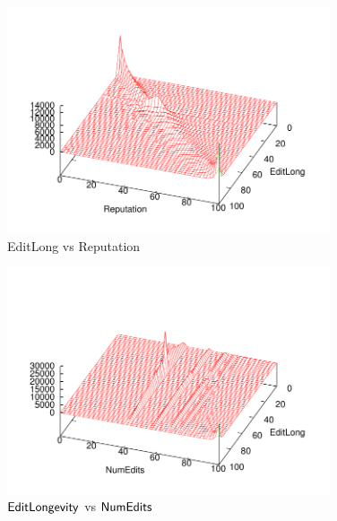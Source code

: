 \begin{figure}[tbph]
    \begin{center}
    \includegraphics[width=0.85\textwidth]{part-I10-contrib/graphs/prct-editlong-reputation}
    \end{center}
    \caption[EditLong vs Reputation]{
    	EditLong vs Reputation
    }
    \label{fig-prct-editlong-reputation}
\end{figure}

\begin{figure}[tbph]
    \begin{center}
    \includegraphics[width=0.85\textwidth]{part-I10-contrib/graphs/prct-editlong-numedits}
    \end{center}
    \caption[$\editlong$ vs $\numedits$]{
    	$\editlong$ vs $\numedits$
    }
    \label{fig-prct-editlong-numedits}
\end{figure}

